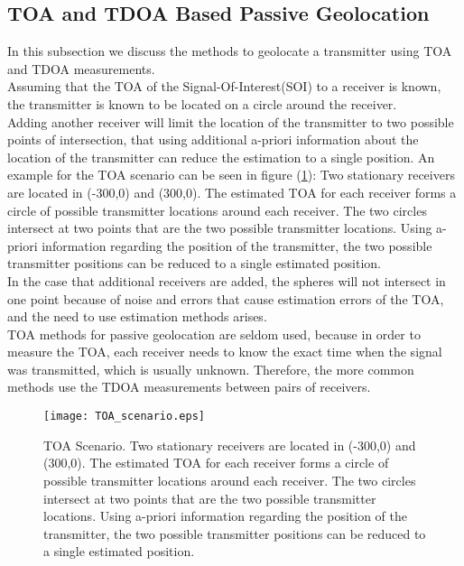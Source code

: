 \subsection{TOA and TDOA Based Passive Geolocation}
In this subsection we discuss the methods to geolocate a transmitter using TOA and TDOA measurements.\\
Assuming that the TOA of the Signal-Of-Interest(SOI) to a receiver is known, the transmitter is known to be located on a circle around the receiver. \\
Adding another receiver will limit the location of the transmitter to two possible points of intersection, that using additional a-priori information about the location of the transmitter can reduce the estimation to a single position. An example for the TOA scenario can be seen in figure (\ref{fig:TOA_scenario}): Two stationary receivers are located in (-300,0) and (300,0). The estimated TOA for each receiver forms a circle of possible transmitter locations around each receiver. The two circles intersect at two points that are the two possible transmitter locations. Using a-priori information regarding the position of the transmitter, the two possible transmitter positions can be reduced to a single estimated position.\\
In the case that additional receivers are added, the spheres will not intersect in one point because of noise and errors that cause estimation errors of the TOA, and the need to use estimation methods arises.\\

TOA methods for passive geolocation are seldom used, because in order to measure the TOA, each receiver needs to know the exact time when the signal was transmitted, which is usually unknown.
Therefore, the more common methods use the TDOA measurements between pairs of receivers.\\

\begin{figure}[htbp]
\begin{center}
\texttt{[image: TOA\_scenario.eps]}
\end{center}
\caption[TOA Scenario]{TOA Scenario. Two stationary receivers are located in (-300,0) and (300,0). The estimated TOA for each receiver forms a circle of possible transmitter locations around each receiver. The two circles intersect at two points that are the two possible transmitter locations. Using a-priori information regarding the position of the transmitter, the two possible transmitter positions can be reduced to a single estimated position.}
\label{fig:TOA_scenario}
\end{figure}

